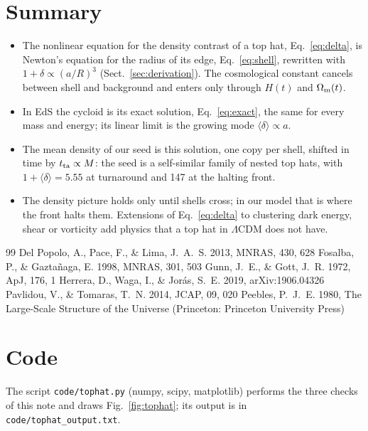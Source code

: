 \documentclass[11pt,a4paper]{article}
\newcommand{\md}{\langle\delta\rangle}
\begin{document}
\section{Summary}

\begin{itemize}
\item The nonlinear equation for the density contrast of a top hat,
Eq.~\eqref{eq:delta}, is Newton's equation for the radius of its edge,
Eq.~\eqref{eq:shell}, rewritten with
$1+\delta\propto(a/R)^{3}$ (Sect.~\ref{sec:derivation}). The
cosmological constant cancels between shell and background and enters
only through $H(t)$ and $\Omega_{\rm m}(t)$.
\item In EdS the cycloid is its exact solution, Eq.~\eqref{eq:exact},
the same for every mass and energy; its linear limit is the growing mode
$\md\propto a$.
\item The mean density of our seed is this solution, one copy per shell,
shifted in time by $t_{\rm ta}\propto M$: the seed is a self-similar
family of nested top hats, with $1+\md=5.55$ at turnaround and 147 at
the halting front.
\item The density picture holds only until shells cross; in our model
that is where the front halts them. Extensions of Eq.~\eqref{eq:delta}
to clustering dark energy, shear or vorticity
\citep{DelPopolo2013,Herrera2019} add physics that a top hat in
$\Lambda$CDM does not have.
\end{itemize}

\begin{thebibliography}{99}
 Del Popolo, A., Pace, F., \& Lima, J.~A.~S. 2013, MNRAS, 430, 628
 Fosalba, P., \& Gazta\~naga, E. 1998, MNRAS, 301, 503
 Gunn, J.~E., \& Gott, J.~R. 1972, ApJ, 176, 1
 Herrera, D., Waga, I., \& Jor\'as, S.~E. 2019, arXiv:1906.04326
 Pavlidou, V., \& Tomaras, T.~N. 2014, JCAP, 09, 020
 Peebles, P.~J.~E. 1980, The Large-Scale Structure of the Universe (Princeton: Princeton University Press)
\end{thebibliography}

\appendix
\section{Code}
The script \texttt{code/tophat.py} (numpy, scipy, matplotlib) performs the
three checks of this note and draws Fig.~\ref{fig:tophat}; its output is
in \texttt{code/tophat\_output.txt}.

\end{document}
